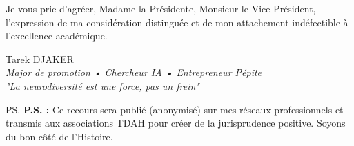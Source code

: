 \documentclass[12pt,french]{scrlttr2}
\begin{document}
\begin{letter}
\vspace{0.5cm}

Je vous prie d'agréer, Madame la Présidente, Monsieur le Vice-Président, l'expression de ma considération distinguée et de mon attachement indéfectible à l'excellence académique.

\closing{Tarek DJAKER\\
\textit{Major de promotion • Chercheur IA • Entrepreneur Pépite}\\
\textit{"La neurodiversité est une force, pas un frein"}}

\ps{\textbf{P.S. :} Ce recours sera publié (anonymisé) sur mes réseaux professionnels et transmis aux associations TDAH pour créer de la jurisprudence positive. Soyons du bon côté de l'Histoire.}



\end{letter}
\end{document}

